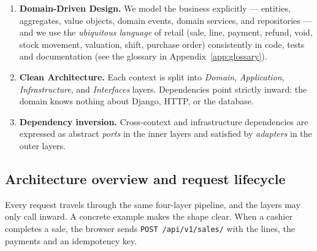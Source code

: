 \documentclass[11pt,a4paper]{article}
\begin{document}
\begin{enumerate}[leftmargin=1.4em]
  \item \textbf{Domain-Driven Design.} We model the business explicitly --- entities, aggregates,
  value objects, domain events, domain services, and repositories --- and we use the \emph{ubiquitous
  language} of retail (sale, line, payment, refund, void, stock movement, valuation, shift,
  purchase order) consistently in code, tests and documentation (see the glossary in
  Appendix~\ref{app:glossary}).
  \item \textbf{Clean Architecture.} Each context is split into \emph{Domain}, \emph{Application},
  \emph{Infrastructure}, and \emph{Interfaces} layers. Dependencies point strictly inward: the domain
  knows nothing about Django, HTTP, or the database.
  \item \textbf{Dependency inversion.} Cross-context and infrastructure dependencies are expressed
  as abstract \emph{ports} in the inner layers and satisfied by \emph{adapters} in the outer layers.
\end{enumerate}

\subsection{Architecture overview and request lifecycle}
\label{sec:overview}

Every request travels through the same four-layer pipeline, and the layers may only call inward. A
concrete example makes the shape clear. When a cashier completes a sale, the browser sends
\texttt{POST /api/v1/sales/} with the lines, the payments and an idempotency key.
\end{document}
